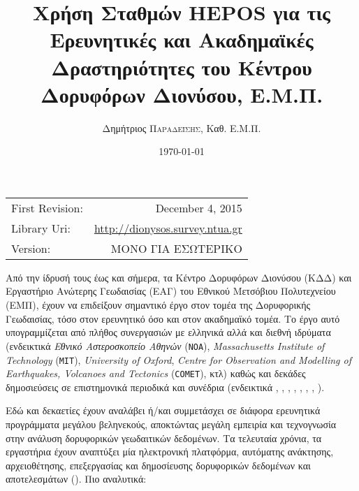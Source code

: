 \documentclass[11pt]{article}
\title{Χρήση Σταθμών HEPOS για τις Ερευνητικές και Ακαδημαϊκές Δραστηριότητες του Κέντρου Δορυφόρων Διονύσου, Ε.Μ.Π.} %
\author{Δημήτριος \textsc{Παραδείσης}, Καθ. Ε.Μ.Π.}
\date{\today} %
\begin{document}
\maketitle %

\begin{center}
\begin{tabular}{l r}
First Revision: & December 4, 2015 \\
Library Uri:    & \url{http://dionysos.survey.ntua.gr} \\
Version:        & ΜΟΝΟ ΓΙΑ ΕΣΩΤΕΡΙΚΟ
\end{tabular}
\end{center}

\clearpage

\clearpage

Από την ίδρυσή τους έως και σήμερα, τα Κέντρο Δορυφόρων Διονύσου (ΚΔΔ) και Εργαστήριο Ανώτερης Γεωδαισίας (ΕΑΓ) του Εθνικού Μετσόβιου Πολυτεχνείου (ΕΜΠ), έχουν να επιδείξουν σημαντικό έργο στον τομέα της Δορυφορικής Γεωδαισίας, τόσο στον ερευνητικό όσο και στον ακαδημαϊκό τομέα. Το έργο αυτό υπογραμμίζεται από πλήθος συνεργασιών με ελληνικά αλλά και διεθνή ιδρύματα (ενδεικτικά \textit{Εθνικό Αστεροσκοπείο Αθηνών} (\texttt{NOA}), \textit{Massachusetts Institute of Technology} (\texttt{MIT}), \textit{University of Oxford}, \textit{Centre for Observation and Modelling of Earthquakes, Volcanoes and Tectonics} (\texttt{COMET}), κτλ) καθώς και δεκάδες δημοσιεύσεις σε επιστημονικά περιοδικά και συνέδρια (ενδεικτικά \cite{Billiris1991}, \cite{JGRB11137}, \cite{Cocard199939}, \cite{JGRB12107}, \cite{Reilinger201022}, \cite{JGRB16426}, \cite{Parks2012}, \cite{Ganas201362}).

Εδώ και δεκαετίες έχουν αναλάβει ή/και συμμετάσχει σε διάφορα ερευνητικά προγράμματα μεγάλου βεληνεκούς, 
αποκτώντας μεγάλη εμπειρία και τεχνογνωσία στην ανάλυση δορυφορικών γεωδαιτικών δεδομένων. Τα τελευταία 
χρόνια, τα εργαστήρια έχουν αναπτύξει μία ηλεκτρονική πλατφόρμα, αυτόματης ανάκτησης, αρχειοθέτησης, 
επεξεργασίας και δημοσίευσης δορυφορικών δεδομένων και αποτελεσμάτων (\cite{papanikegu}). Πιο αναλυτικά:
\end{document}
